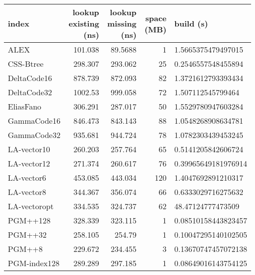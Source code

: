 \begin{tabular}{lrrrl}
\hline
 index             &   lookup existing (ns) &   lookup missing (ns) &   space (MB) & build (s)             \\
\hline
 ALEX              &               101.038  &               89.5688 &            1 & 1.5665375479497015    \\
 CSS-Btree         &               298.307  &              293.062  &           25 & 0.2546557548455894    \\
 DeltaCode16       &               878.739  &              872.093  &           82 & 1.3721612793393434    \\
 DeltaCode32       &              1002.53   &              999.058  &           72 & 1.507112545799464     \\
 EliasFano         &               306.291  &              287.017  &           50 & 1.5529780947603284    \\
 GammaCode16       &               846.473  &              843.143  &           88 & 1.0548268908634781    \\
 GammaCode32       &               935.681  &              944.724  &           78 & 1.0782303439453245    \\
 LA-vector10       &               260.203  &              257.764  &           65 & 0.5141205842606724    \\
 LA-vector12       &               271.374  &              260.617  &           76 & 0.39965649181976914   \\
 LA-vector6        &               453.085  &              443.034  &          120 & 1.4047692891210317    \\
 LA-vector8        &               344.367  &              356.074  &           66 & 0.6333029716275632    \\
 LA-vectoropt      &               334.535  &              324.737  &           62 & 48.47124777473509     \\
 PGM++128          &               328.339  &              323.115  &            1 & 0.08510158443823457   \\
 PGM++32           &               258.105  &              254.79   &            1 & 0.10047295140102505   \\
 PGM++8            &               229.672  &              234.455  &            3 & 0.13670747457072138   \\
 PGM-index128      &               289.289  &              297.185  &            1 & 0.08649016143754125   \\

\end{tabular}
